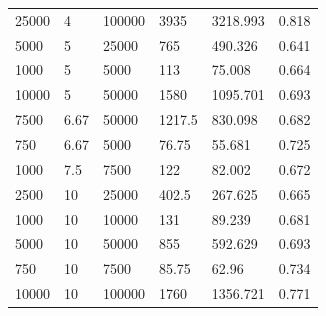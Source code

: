 \documentclass[11pt]{article}
\newcommand{\+}{\discretionary{\mbox{\scriptsize$\hookleftarrow$}}{}{}}
\begin{document}
\begin{table}[]
\begin{tabular}{|l|l|l|l|l||l|}
	25000                   & 4                                 & 100000                    & 3935                          & 3218.993                 & 0.818                                  \\
	5000                    & 5                                 & 25000                     & 765                           & 490.326                  & 0.641                                  \\
	1000                    & 5                                 & 5000                      & 113                           & 75.008                   & 0.664                                  \\
	10000                   & 5                                 & 50000                     & 1580                          & 1095.701                 & 0.693                                  \\
	7500                    & 6.67                              & 50000                     & 1217.5                        & 830.098                  & 0.682                                  \\
	750                     & 6.67                              & 5000                      & 76.75                         & 55.681                   & 0.725                                  \\
	1000                    & 7.5                               & 7500                      & 122                           & 82.002                   & 0.672                                  \\
	2500                    & 10                                & 25000                     & 402.5                         & 267.625                  & 0.665                                  \\
	1000                    & 10                                & 10000                     & 131                           & 89.239                   & 0.681                                  \\
	5000                    & 10                                & 50000                     & 855                           & 592.629                  & 0.693                                  \\
	750                     & 10                                & 7500                      & 85.75                         & 62.96                    & 0.734                                  \\
	10000                   & 10                                & 100000                    & 1760                          & 1356.721                 & 0.771                                  \\

\end{tabular}
\end{table}
\end{document}
